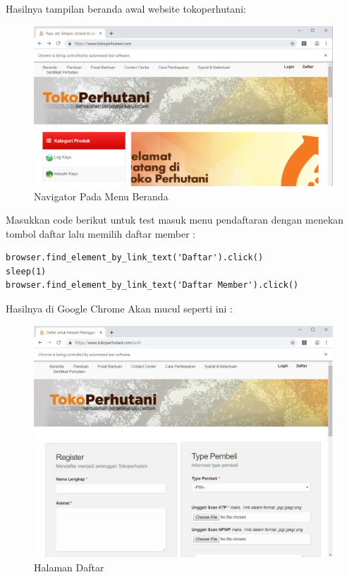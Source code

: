 Hasilnya tampilan beranda awal website tokoperhutani:


\begin{figure}[h]
	\centering
	\includegraphics[scale=0.425]{figures/1home}
	\caption{Navigator Pada Menu Beranda}
\end{figure}
Masukkan code berikut untuk test masuk menu pendaftaran dengan menekan tombol daftar lalu memilih daftar member :
\begin{verbatim}
browser.find_element_by_link_text('Daftar').click()
sleep(1)
browser.find_element_by_link_text('Daftar Member').click()
\end{verbatim}

Hasilnya  di Google Chrome Akan mucul seperti ini :
\begin{figure}[h]
	\centering
	\includegraphics[scale=0.25]{figures/3daftar}
	\caption{Halaman Daftar}
\end{figure}

